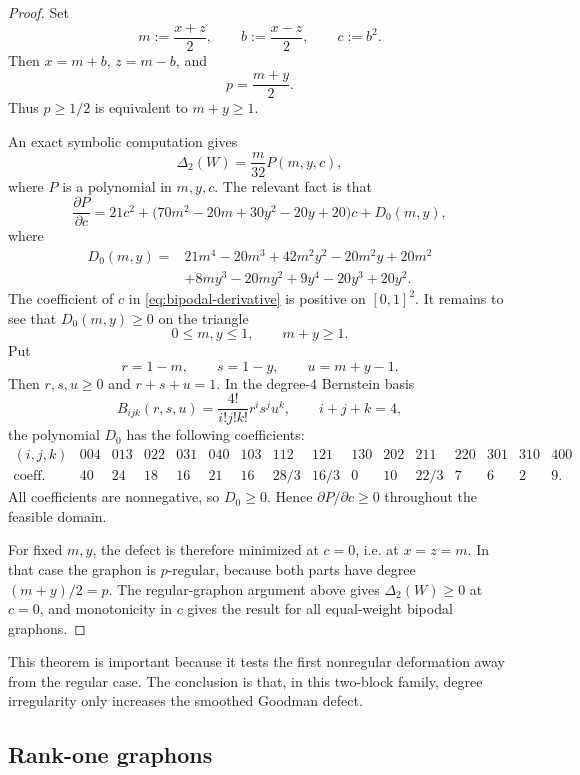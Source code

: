 \documentclass[11pt]{article}
\theoremstyle{definition}
\begin{document}
\begin{proof}
Set
\[
  m:=\frac{x+z}{2},\qquad b:=\frac{x-z}{2},\qquad c:=b^2.
\]
Then $x=m+b$, $z=m-b$, and
\[
  p=\frac{m+y}{2}.
\]
Thus $p\ge1/2$ is equivalent to $m+y\ge1$.

An exact symbolic computation gives
\[
  \Delta_2(W)=\frac{m}{32}P(m,y,c),
\]
where $P$ is a polynomial in $m,y,c$.  The relevant fact is that
\begin{equation}\label{eq:bipodal-derivative}
  \frac{\partial P}{\partial c}
  =21c^2+\bigl(70m^2-20m+30y^2-20y+20\bigr)c+D_0(m,y),
\end{equation}
where
\begin{align*}
D_0(m,y)={}&21m^4-20m^3+42m^2y^2-20m^2y+20m^2 \\
&+8my^3-20my^2+9y^4-20y^3+20y^2.
\end{align*}
The coefficient of $c$ in \eqref{eq:bipodal-derivative} is positive on $[0,1]^2$.  It remains to see that $D_0(m,y)\ge0$ on the triangle
\[
  0\le m,y\le1,
  \qquad m+y\ge1.
\]
Put
\[
  r=1-m,
  \qquad s=1-y,
  \qquad u=m+y-1.
\]
Then $r,s,u\ge0$ and $r+s+u=1$.  In the degree-$4$ Bernstein basis
\[
  B_{ijk}(r,s,u)=\frac{4!}{i!j!k!}r^is^ju^k,
  \qquad i+j+k=4,
\]
the polynomial $D_0$ has the following coefficients:
\[
\begin{array}{c|ccccccccccccccc}
(i,j,k)&004&013&022&031&040&103&112&121&130&202&211&220&301&310&400\\
\hline
\text{coeff.}&40&24&18&16&21&16&28/3&16/3&0&10&22/3&7&6&2&9.
\end{array}
\]
All coefficients are nonnegative, so $D_0\ge0$.  Hence $\partial P/\partial c\ge0$ throughout the feasible domain.

For fixed $m,y$, the defect is therefore minimized at $c=0$, i.e. at $x=z=m$.  In that case the graphon is $p$-regular, because both parts have degree $(m+y)/2=p$.  The regular-graphon argument above gives $\Delta_2(W)\ge0$ at $c=0$, and monotonicity in $c$ gives the result for all equal-weight bipodal graphons.
\end{proof}

This theorem is important because it tests the first nonregular deformation away from the regular case.  The conclusion is that, in this two-block family, degree irregularity only increases the smoothed Goodman defect.

\subsection{Rank-one graphons}
\end{document}
